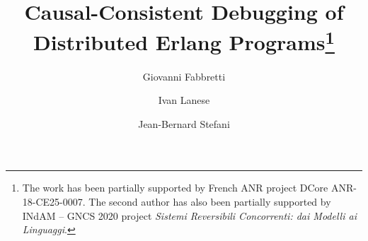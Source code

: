 \documentclass[runningheads]{llncs}
\begin{document}
 
% 
\title{Causal-Consistent Debugging of\\ Distributed Erlang Programs\thanks{The work has been partially supported by French ANR project DCore
    ANR-18-CE25-0007. The second author has also been partially supported by INdAM -- GNCS 2020 project \emph{Sistemi Reversibili Concorrenti: dai Modelli ai Linguaggi}.}
} 
% 
% 
\author{Giovanni Fabbretti \and 
Ivan Lanese \and 
Jean-Bernard Stefani} 
% 
%
%
\maketitle %
%
\end{document}
